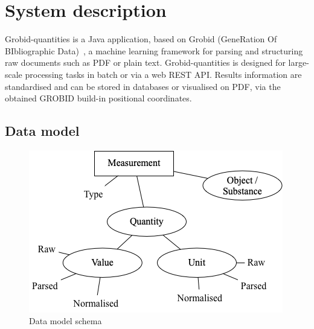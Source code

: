 \documentclass[sigconf]{acmart}
\begin{document}
\section{System description}
\label{sec:system}
Grobid-quantities is a Java application, based on Grobid (GeneRation Of BIbliographic Data)~\cite{GROBID}, a machine learning framework for parsing and structuring raw documents such as PDF or plain text. Grobid-quantities is designed for large-scale processing tasks in batch or via a web REST API. Results information are standardised and can be stored in databases or visualised on PDF, via the obtained GROBID build-in positional coordinates.

\subsection{Data model}
\label{subsub:data-model}
\begin{figure}[ht]
  \centering
  \includegraphics[width=\linewidth]{images/schema-2}
  \caption{Data model schema}
  \label{fig:data-model-schema-2}
\end{figure}
\end{document}
